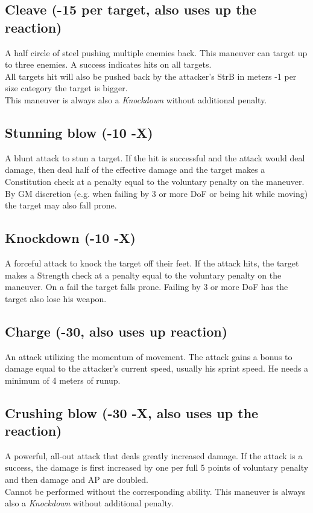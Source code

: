 \subsection*{Cleave (-15 per target, also uses up the reaction)}
A half circle of steel pushing multiple enemies back. This maneuver can target up to three enemies. A success indicates hits on all targets.\\
All targets hit will also be pushed back by the attacker’s StrB in meters -1 per size category the target is bigger.\\
This maneuver is always also a \emph{Knockdown} without additional penalty.
\subsection*{Stunning blow (-10 -X)}
A blunt attack to stun a target. If the hit is successful and the attack would deal damage, then deal half of the effective damage and the target makes a Constitution check at a penalty equal to the voluntary penalty on the maneuver.\\
By GM discretion (e.g. when failing by 3 or more DoF or being hit while moving) the target may also fall prone.
\subsection*{Knockdown (-10 -X)}
A forceful attack to knock the target off their feet. If the attack hits, the target makes a Strength check at a penalty equal to the voluntary penalty on the maneuver. On a fail the target falls prone. Failing by 3 or more DoF has the target also lose his weapon.
\subsection*{Charge (-30, also uses up reaction)}
An attack utilizing the momentum of movement. The attack gains a bonus to damage equal to the attacker’s current speed, usually his sprint speed. He needs a minimum of 4 meters of runup.
\subsection*{Crushing blow (-30 -X, also uses up the reaction)}
A powerful, all-out attack that deals greatly increased damage. If the attack is a success, the damage is first increased by one per full 5 points of voluntary penalty and then damage and AP are doubled.\\
Cannot be performed without the corresponding ability. This maneuver is always also a \emph{Knockdown} without additional penalty.

